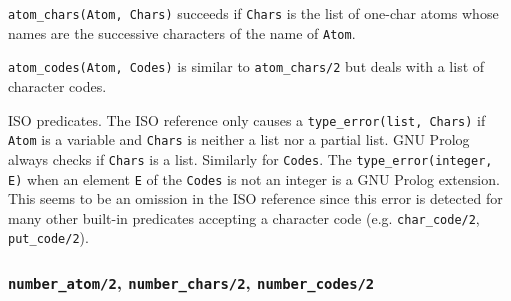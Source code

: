 \Description

\texttt{atom\_chars(Atom, Chars)} succeeds if \texttt{Chars}
is the list of one-char atoms whose names are the successive characters of
the name of \texttt{Atom}.

\texttt{atom\_codes(Atom, Codes)} is similar to
\texttt{atom\_chars/2} but deals with a list of character codes.

\begin{PlErrors}





 

 

 

\end{PlErrors}

\Portability

ISO predicates. The ISO reference only causes a \texttt{type\_error(list,
Chars)} if \texttt{Atom} is a variable and \texttt{Chars} is neither a list
nor a partial list. GNU Prolog always checks if \texttt{Chars} is a list.
Similarly for \texttt{Codes}. The \texttt{type\_error(integer, E)} when an
element \texttt{E} of the \texttt{Codes} is not an integer is a GNU Prolog
extension. This seems to be an omission in the ISO reference since this
error is detected for many other built-in predicates accepting a character
code (e.g. \texttt{char\_code/2}, \texttt{put\_code/2}).

\subsubsection{\texttt{number\_atom/2},
               \texttt{number\_chars/2},
               \texttt{number\_codes/2}}
\label{number-atom/2}

